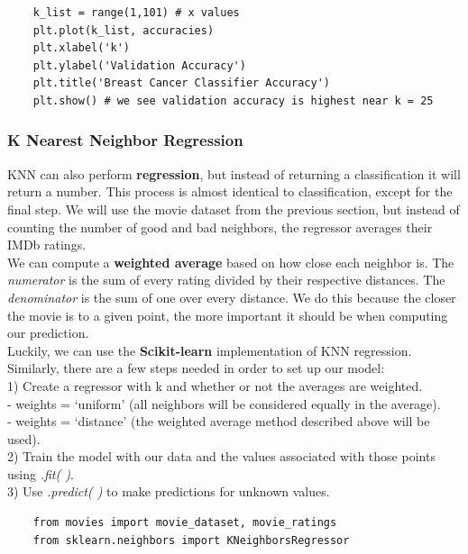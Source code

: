 \documentclass[11pt, a4paper]{article}
\begin{document}
\begin{spacing}{1.1}
\begin{lstlisting}
	k_list = range(1,101) # x values
	plt.plot(k_list, accuracies)
	plt.xlabel('k')
	plt.ylabel('Validation Accuracy')
	plt.title('Breast Cancer Classifier Accuracy')
	plt.show() # we see validation accuracy is highest near k = 25	\end{lstlisting} \newpage
	
	\subsubsection{K Nearest Neighbor Regression}
	KNN can also perform \textbf{regression}, but instead of returning a classification it will return a number. This process is almost identical to classification, except for the final step. We will use the movie dataset from the previous section, but instead of counting the number of good and bad neighbors, the regressor averages their IMDb ratings. \vspace*{2mm} \\
	We can compute a \textbf{weighted average} based on how close each neighbor is. The \textit{numerator} is the sum of every rating divided by their respective distances. The \textit{denominator} is the sum of one over every distance. We do this because the closer the movie is to a given point, the more important it should be when computing our prediction. \vspace*{2mm} \\
	Luckily, we can use the \textbf{Scikit-learn} implementation of KNN regression. Similarly, there are a few steps needed in order to set up our model: \\
	\hspace*{3mm} 1) Create a regressor with k and whether or not the averages are weighted. \\
	\hspace*{7mm} - weights = `uniform' (all neighbors will be considered equally in the average). \\
	\hspace*{7mm} - weights = `distance' (the weighted average method described above will be used). \\
	\hspace*{3mm} 2) Train the model  with our data and the values associated with those points using \textit{.fit( )}. \\
	\hspace*{3mm} 3) Use \textit{.predict( )} to make predictions for unknown values.	
	\begin{lstlisting}
	from movies import movie_dataset, movie_ratings
	from sklearn.neighbors import KNeighborsRegressor
	

\end{lstlisting}
\end{spacing}
\end{document}
